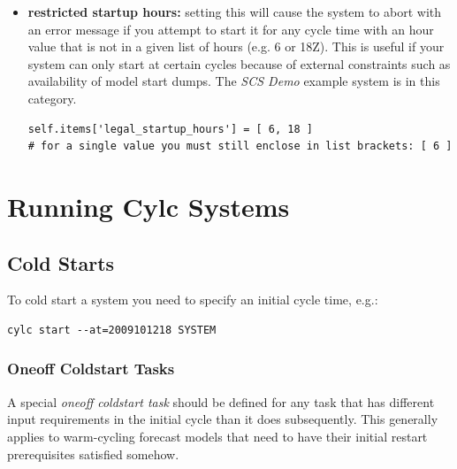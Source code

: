 \documentclass[11pt,a4paper]{article}
\begin{document}
\begin{itemize}
    \item {\bf restricted startup hours:} setting this will cause 
        the system to abort with an error message if you attempt to
        start it for any cycle time with an hour value that is not in a given
        list of hours (e.g. 6 or 18Z). This is useful if your system 
        can only start at certain cycles because of external constraints
        such as availability of model start dumps. The {\em SCS Demo}
        example system is in this category.

    \begin{lstlisting}
self.items['legal_startup_hours'] = [ 6, 18 ]
# for a single value you must still enclose in list brackets: [ 6 ] 
    \end{lstlisting}

\end{itemize}


\pagebreak

%
%
%

\lstset{language=}


\pagebreak
\section{Running Cylc Systems}
\label{RunningCylcSystems}

\subsection{Cold Starts}

To cold start a system you need to specify an initial cycle time, e.g.:

\begin{lstlisting}
cylc start --at=2009101218 SYSTEM
\end{lstlisting}

\subsubsection{Oneoff Coldstart Tasks}

A special {\em oneoff coldstart task} should be defined for any task
that has different input requirements in the initial cycle than it does
subsequently. This generally applies to warm-cycling forecast models
that need to have their initial restart prerequisites satisfied somehow. 
\end{document}
